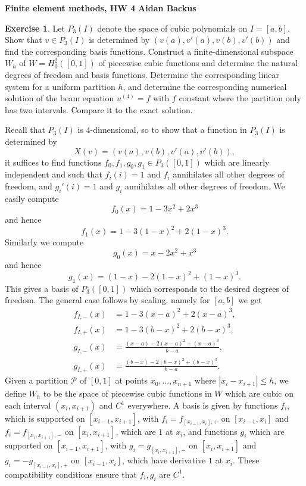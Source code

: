 \documentclass[10pt]{article}
\theoremstyle{definition}
\newtheorem{exer}{Exercise}
\begin{document}
\noindent
\large\textbf{Finite element methods, HW 4} \hfill \textbf{Aidan Backus} \\

\begin{exer}
Let $P_3(I)$ denote the space of cubic polynomials on $I = [a, b]$.
Show that $v \in P_3(I)$ is determined by $(v(a), v'(a), v(b), v'(b))$ and find the corresponding basis functions.
Construct a finite-dimensional subspace $W_h$ of $W = H^2_0([0, 1])$ of piecewise cubic functions and determine the natural degrees of freedom and basis functions.
Determine the corresponding linear system for a uniform partition $h$, and determine the corresponding numerical solution of the beam equation $u^{(4)} = f$ with $f$ constant where the partition only has two intervals.
Compare it to the exact solution.
\end{exer}

Recall that $P_3(I)$ is $4$-dimensional, so to show that a function in $P_3(I)$ is determined by
$$X(v) = (v(a), v(b), v'(a), v'(b)),$$
it suffices to find functions $f_0, f_1, g_0, g_1 \in P_3([0, 1])$ which are linearly independent and such that $f_i(i) = 1$ and $f_i$ annihilates all other degrees of freedom, and $g_i'(i) = 1$ and $g_i$ annihilates all other degrees of freedom. We easily compute
$$f_0(x) = 1 - 3x^2 + 2x^3$$
and hence
$$f_1(x) = 1 - 3(1 - x)^2 + 2(1 - x)^3.$$
Similarly we compute
$$g_0(x) = x - 2x^2 + x^3$$
and hence
$$g_1(x) = (1 - x) - 2(1 - x)^2 + (1 - x)^3.$$
This gives a basis of $P_3([0, 1])$ which corresponds to the desired degrees of freedom. The general case follows by scaling, namely for $[a, b]$ we get
\begin{align*}
f_{I, -}(x) &= 1 - 3(x - a)^2 + 2(x - a)^3,\\
f_{I, +}(x) &= 1 - 3(b - x)^2 + 2(b - x)^3,\\
g_{I, -}(x) &= \frac{(x - a) - 2(x - a)^2 + (x - a)^3}{b - a}, \\
g_{I, +}(x) &= \frac{(b - x) - 2(b - x)^2 + (b - x)^3}{b - a}.
\end{align*}
Given a partition $\mathcal P$ of $[0, 1]$ at points $x_0, \dots, x_{n + 1}$ where $|x_i - x_{i + 1}| \leq h$, we define $W_h$ to be the space of piecewise cubic functions in $W$ which are cubic on each interval $(x_i, x_{i + 1})$ and $C^1$ everywhere.
A basis is given by functions $f_i$, which is supported on $[x_{i - 1}, x_{i + 1}]$, with $f_i = f_{[x_{i - 1}, x_i], +}$ on $[x_{i - 1}, x_i]$ and $f_i = f_{[x_i, x_{i + 1}], -}$ on $[x_i, x_{i + 1}]$, which are $1$ at $x_i$,
and functions $g_i$ which are supported on $[x_{i - 1}, x_{i + 1}]$, with $g_i = g_{[x_i, x_{i + 1}], -}$ on $[x_i, x_{i + 1}]$ and $g_i = - g_{[x_{i - 1}, x_i], +}$ on $[x_{i - 1}, x_i]$, which have derivative $1$ at $x_i$.
These compatibility conditions ensure that $f_i,g_i$ are $C^1$.
\end{document}
